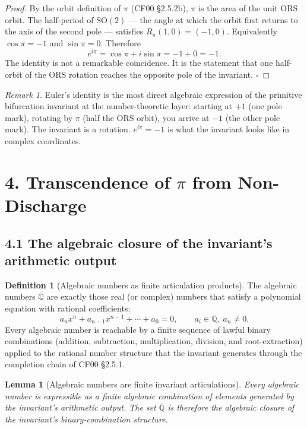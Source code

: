\documentclass[11pt]{article}
\newtheorem{lemma}[theorem]{Lemma}
\theoremstyle{definition}
\newtheorem{definition}[theorem]{Definition}
\theoremstyle{remark}
\newtheorem{remark}[theorem]{Remark}
\begin{document}
\begin{proof}
By the orbit definition of $\pi$ (CF00 \S 2.5.2b), $\pi$ is the area
of the unit ORS orbit. The half-period of $\mathrm{SO}(2)$ --- the
angle at which the orbit first returns to the axis of the second pole
--- satisfies $R_\pi(1,0)=(-1,0)$. Equivalently $\cos\pi=-1$ and
$\sin\pi=0$. Therefore
\[
e^{i\pi}=\cos\pi + i\sin\pi = -1 + 0 = -1.
\]
The identity is not a remarkable coincidence. It is the statement that
one half-orbit of the ORS rotation reaches the opposite pole of the
invariant. $\square$
\end{proof}

\begin{remark}
Euler's identity is the most direct algebraic expression of the
primitive bifurcation invariant at the number-theoretic layer: starting
at $+1$ (one pole mark), rotating by $\pi$ (half the ORS orbit), you
arrive at $-1$ (the other pole mark). The invariant is a rotation.
$e^{i\pi}=-1$ is what the invariant looks like in complex coordinates.
\end{remark}

\section{4. Transcendence of $\pi$ from Non-Discharge}

\subsection{4.1 The algebraic closure of the invariant's arithmetic output}

\begin{definition}[Algebraic numbers as finite articulation products]
The algebraic numbers $\overline{\mathbb{Q}}$ are exactly those real
(or complex) numbers that satisfy a polynomial equation with rational
coefficients:
\[
a_n x^n + a_{n-1}x^{n-1}+\cdots+a_0 = 0, \qquad a_i\in\mathbb{Q},\; a_n\neq 0.
\]
Every algebraic number is reachable by a finite sequence of lawful
binary combinations (addition, subtraction, multiplication, division,
and root-extraction) applied to the rational number structure that the
invariant generates through the completion chain of CF00 \S 2.5.1.
\end{definition}

\begin{lemma}[Algebraic numbers are finite invariant articulations]\label{lem:alg}
Every algebraic number is expressible as a finite algebraic combination
of elements generated by the invariant's arithmetic output. The set
$\overline{\mathbb{Q}}$ is therefore the algebraic closure of the
invariant's binary-combination structure.
\end{lemma}
\end{document}
